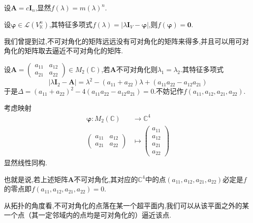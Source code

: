 \begin{brown}
\begin{example}
    设$\bm{A}=c\bm{I}_n$,显然$f\left(\lambda\right)=m\left(\lambda\right)^n.$
\end{example}
\end{brown}
\begin{green}
\begin{corollary}\label{cor:几何意义的Cayley-Hamilton定理}
    设$\bm{\varphi}\in \mathcal{L}\left(V_{\mathbb{K}}^n\right)$,其特征多项式$f\left(\lambda\right)=\left|
         \lambda\bm{I}_V-\bm{\varphi}
    \right|$,则$f\left(\bm{\varphi}\right)=\bm{0}.$
\end{corollary}
\end{green}
我们曾提到过,不可对角化的矩阵远远没有可对角化的矩阵来得多,并且可以用可对角化的矩阵取去逼近不可对角化的矩阵.
\begin{brown}
\begin{example}
    设$\bm{A}=\begin{pmatrix}
        a_{11}  &a_{12}\\
        a_{21}  &a_{22}
    \end{pmatrix}\in M_2\left(\mathbb{C}\right)$,若$\bm{A}$不可对角化则$\lambda_1=\lambda_2.$其特征多项式
    \[
    \left|
    \lambda\bm{I}_2-\bm{A}   
    \right|=\lambda^2-\left(
        a_{11}+a_{22}
    \right)\lambda+\left(
        a_{11}a_{22}-a_{12}a_{21}
    \right)
    \]于是$\varDelta
     = \left(
        a_{11}+a_{22}
    \right)^2-4\left(
        a_{11}a_{22}-a_{12}a_{21}
    \right)=0
    $.不妨记作$f\left(
        a_{11}, a_{12}, a_{21}, a_{22}
    \right).$
    
    考虑映射
    \begin{align*}
        \bm{\varphi}:M_2\left(\mathbb{C}\right)&\longrightarrow \mathbb{C}^4\\
        \begin{pmatrix}
            a_{11}&a_{12}\\
            a_{21}&a_{22}
        \end{pmatrix}&\longmapsto \begin{pmatrix}
            a_{11}\\
            a_{12}\\
            a_{21}\\
            a_{22}
        \end{pmatrix}
    \end{align*}显然线性同构.

    也就是说,若上述矩阵$\bm{A}$不可对角化,其对应的$\mathbb{C}^4$中的点$\left(
        a_{11},a_{12},a_{21},a_{22}
    \right)$必定是$f$的零点即$f\left(
        a_{11},a_{12},a_{21},a_{22}
    \right)=0.$

    从拓扑的角度看,不可对角化的点落在某一个超平面内,我们可以从该平面之外的某一个点（其一定邻域内的点均是可对角化的）逼近该点.
\end{example}
\end{brown}

